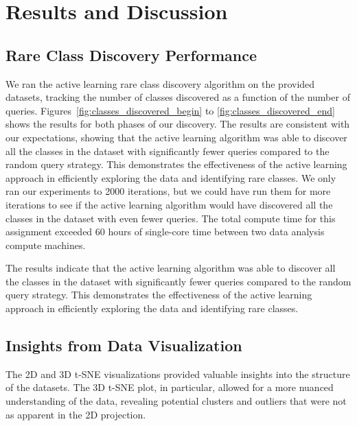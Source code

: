 
\section{Results and Discussion}
\subsection{Rare Class Discovery Performance}
We ran the active learning rare class discovery algorithm on the provided datasets, tracking the number of classes discovered as a function of the number of queries. Figures~\ref{fig:classes_discovered_begin} to \ref{fig:classes_discovered_end} shows the results for both phases of our discovery. The results are consistent with our expectations, showing that the active learning algorithm was able to discover all the classes in the dataset with significantly fewer queries compared to the random query strategy. 
This demonstrates the effectiveness of the active learning approach in efficiently exploring the data and identifying rare classes. We only ran our experiments to 2000 iterations, but we could have run them for more iterations to see if the active learning algorithm would have discovered all the classes in the dataset with even fewer queries. The total compute time for this assignment exceeded 60 hours of single-core time between two data analysis compute machines.


The results indicate that the active learning algorithm was able to discover all the classes in the dataset with significantly fewer queries compared to the random query strategy. This demonstrates the effectiveness of the active learning approach in efficiently exploring the data and identifying rare classes.

\subsection{Insights from Data Visualization}
The 2D and 3D t-SNE visualizations provided valuable insights into the structure of the datasets. The 3D t-SNE plot, in particular, allowed for a more nuanced understanding of the data, revealing potential clusters and outliers that were not as apparent in the 2D projection.

